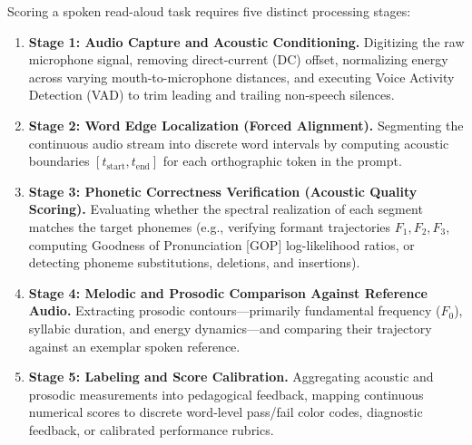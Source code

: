 \documentclass[11pt,a4paper]{article}
\begin{document}
Scoring a spoken read-aloud task requires five distinct processing stages:
\begin{enumerate}
    \item \textbf{Stage 1: Audio Capture and Acoustic Conditioning.} Digitizing the raw microphone signal, removing direct-current (DC) offset, normalizing energy across varying mouth-to-microphone distances, and executing Voice Activity Detection (VAD) to trim leading and trailing non-speech silences.
    \item \textbf{Stage 2: Word Edge Localization (Forced Alignment).} Segmenting the continuous audio stream into discrete word intervals by computing acoustic boundaries $[t_{\text{start}}, t_{\text{end}}]$ for each orthographic token in the prompt.
    \item \textbf{Stage 3: Phonetic Correctness Verification (Acoustic Quality Scoring).} Evaluating whether the spectral realization of each segment matches the target phonemes (e.g., verifying formant trajectories $F_1, F_2, F_3$, computing Goodness of Pronunciation [GOP] log-likelihood ratios, or detecting phoneme substitutions, deletions, and insertions).
    \item \textbf{Stage 4: Melodic and Prosodic Comparison Against Reference Audio.} Extracting prosodic contours---primarily fundamental frequency ($F_0$), syllabic duration, and energy dynamics---and comparing their trajectory against an exemplar spoken reference.
    \item \textbf{Stage 5: Labeling and Score Calibration.} Aggregating acoustic and prosodic measurements into pedagogical feedback, mapping continuous numerical scores to discrete word-level pass/fail color codes, diagnostic feedback, or calibrated performance rubrics.
\end{enumerate}
\end{document}

